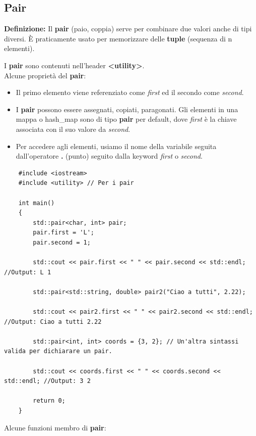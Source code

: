 \subsection{Pair}

\textsf{\small \textbf{Definizione: } Il \textbf{pair} (paio, coppia) serve per combinare due valori anche di tipi diversi. È praticamente usato per memorizzare delle \textbf{tuple} (sequenza di n elementi).} \break

\textsf{\small I \textbf{pair} sono contenuti nell'header \textbf{<utility>}.} \\

\textsf{\small Alcune proprietà del \textbf{pair}: } \\

\begin{itemize}
	\item \textsf{\small Il primo elemento viene referenziato come \emph{first} ed il secondo come \emph{second}.}
	\item \textsf{\small I \textbf{pair} possono essere assegnati, copiati, paragonati. Gli elementi in una mappa o hash\_map sono di tipo \textbf{pair} per default, dove \emph{first} è la chiave associata con il suo valore da \emph{second}.}
	\item \textsf{\small Per accedere agli elementi, usiamo il nome della variabile seguita dall'operatore \textbf{.} (punto) seguito dalla keyword \emph{first} o \emph{second}.}
\end{itemize}

\begin{lstlisting}
	#include <iostream>
	#include <utility> // Per i pair
	
	int main()
	{
		std::pair<char, int> pair;
		pair.first = 'L';
		pair.second = 1;
		
		std::cout << pair.first << " " << pair.second << std::endl; //Output: L 1
		
		std::pair<std::string, double> pair2("Ciao a tutti", 2.22);
		
		std::cout << pair2.first << " " << pair2.second << std::endl; //Output: Ciao a tutti 2.22
		
		std::pair<int, int> coords = {3, 2}; // Un'altra sintassi valida per dichiarare un pair.
		
		std::cout << coords.first << " " << coords.second << std::endl; //Output: 3 2
		
		return 0;
	}
\end{lstlisting}

\textsf{\small Alcune funzioni membro di \textbf{pair}: } \\

